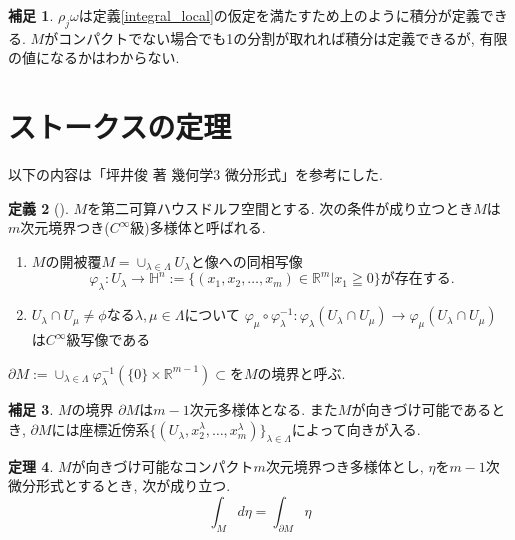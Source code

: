 \documentclass[dvipdfmx,a4paper,11pt]{article}
\newcommand{\R}{\mathbb{R}}
\theoremstyle{definition}
\newtheorem{thm}{定理}
\newtheorem{dfn}[thm]{定義}
\newtheorem{rem}[thm]{補足}
\begin{document}
\begin{rem}
 $\rho_j \omega$は定義\ref{integral_local}の仮定を満たすため上のように積分が定義できる. 
$M$がコンパクトでない場合でも1の分割が取れれば積分は定義できるが, 有限の値になるかはわからない. 
\end{rem}

 \section{ストークスの定理}
 以下の内容は「坪井俊 著 幾何学3 微分形式」を参考にした.

    \begin{tcolorbox}[
    colback = white,
    colframe = green!35!black,
    fonttitle = \bfseries,
    breakable = true]
    \begin{dfn}[]
    $M$を第二可算ハウスドルフ空間とする. 次の条件が成り立つとき$M$は$m$次元境界つき($C^{\infty}$級)多様体と呼ばれる.
     \begin{enumerate}
     \setlength{\parskip}{0cm}
  \setlength{\itemsep}{2pt} 
     \item $M$の開被覆$M = \cup_{\lambda \in \Lambda} U_{\lambda}$と像への同相写像
     $$
     \varphi_{\lambda} : U_{\lambda} \rightarrow \mathbb{H}^n := \{ (x_1, x_2, \ldots, x_m) \in \R^m | x_1 \geqq 0\}
     \text{が存在する.}
     $$
     \item $U_\lambda \cap U_\mu \neq \phi$なる$\lambda, \mu \in \Lambda$について
    $
   \varphi_\mu\circ \varphi_{\lambda}^{-1} : \varphi_{\lambda}(U_\lambda \cap U_\mu) \rightarrow \varphi_{\mu}(U_\lambda \cap U_\mu) 
    $
    は$C^{\infty}$級写像である
     \end{enumerate}
 $\partial M := \cup_{\lambda \in \Lambda} \varphi_{\lambda}^{-1}(\{ 0\} \times \R^{m-1}) \subset $を$M$の境界と呼ぶ.
    \end{dfn}
    \end{tcolorbox}   
\begin{rem}
$M$の境界 $\partial M$は$m-1$次元多様体となる. また$M$が向きづけ可能であるとき, $\partial M$には座標近傍系$\{(U_\lambda, x_{2}^{\lambda}, \ldots, x_{m}^{\lambda})\}_{\lambda \in \Lambda}$によって向きが入る.
\end{rem}

  \begin{tcolorbox}[
    colback = white,
    colframe = green!35!black,
    fonttitle = \bfseries,
    breakable = true]
\begin{thm}
$M$が向きづけ可能なコンパクト$m$次元境界つき多様体とし, $\eta$を$m-1$次微分形式とするとき, 次が成り立つ. 
$$
\int_{M} d \eta = \int_{\partial M} \eta 
$$
    \end{thm}
    \end{tcolorbox} 
    
\end{document}

